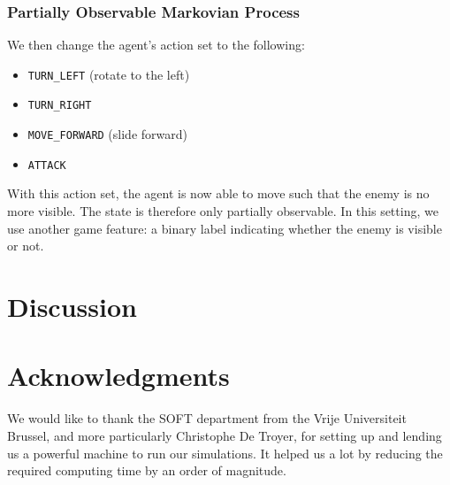 \documentclass[letterpaper]{article}
\begin{document}
\subsubsection{Partially Observable Markovian Process}
We then change the agent's action set to the following:
\begin{itemize}
  \item \texttt{TURN\_LEFT} (rotate to the left)
  \item \texttt{TURN\_RIGHT}
  \item \texttt{MOVE\_FORWARD} (slide forward)
  \item \texttt{ATTACK}
\end{itemize}
With this action set, the agent is now able to move such that the enemy is no
more visible. The state is therefore only partially observable. In this setting,
we use another game feature: a binary label indicating whether the enemy is visible
or not.


\section{Discussion}


\section{Acknowledgments}
We would like to thank the SOFT department from the Vrije Universiteit Brussel,
and more particularly Christophe De Troyer, for setting up and lending us a
powerful machine to run our simulations. It helped us a lot by reducing the
required computing time by an order of magnitude.

\footnotesize


\end{document}
